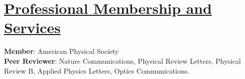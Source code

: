 \documentclass[12pt]{article}
\providecommand*\email[1]{\href{mailto:#1}{#1}}
\begin{document}
\vspace{-0.1in}
 \section*{\underline{Professional Membership and Services}} 
\textbf{Member}: American Physical Society \\
\textbf{Peer Reviewer}: Nature Communications, Physical Review Letters, Physical Review B, Applied Physics Letters, Optics Communications.
 
 
\end{document}

